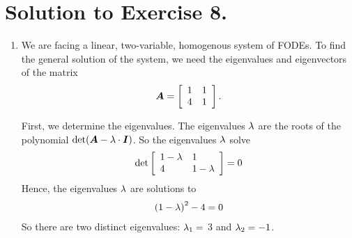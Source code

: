 \documentclass[letterpaper,12pt,leqno]{article}
\begin{document}
\section*{Solution to Exercise 8.}
\begin{enumerate}
\item We are facing a linear, two-variable, homogenous system of FODEs. To find the general solution of the system, we need the eigenvalues and eigenvectors of the matrix 
\begin{align*}
\bm{A}=\left[ 
\begin{array}{ll}
1 & 1 \\ 
4 & 1 
\end{array} \right].
\end{align*}

First, we determine the eigenvalues. The eigenvalues $\lambda$ are the roots of the polynomial $\det(\bm{A}-\lambda\cdot \bm{I})$. So the eigenvalues $\lambda$ solve
 \begin{align*}
\det\left[ \begin{array}{ll}
1-\lambda & 1 \\ 
4 & 1-\lambda 
\end{array} \right] =0
\end{align*}
Hence, the eigenvalues $\lambda$ are solutions to
\begin{align*}
\left( 1-\lambda \right) ^{2}-4=0
\end{align*}
So there are two distinct eigenvalues: $\lambda_{1}=$ $3$ and $\lambda_{2}=-1$.


\end{enumerate}
\end{document}
